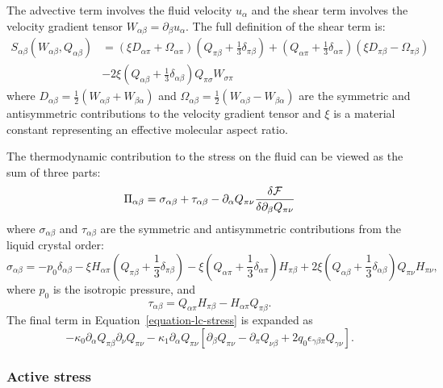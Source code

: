 The advective term involves the fluid velocity $u_\alpha$ and the shear
term involves the velocity gradient tensor
$W_{\alpha\beta}= \partial_\beta u_\alpha$. The full definition of the
shear term is:
\begin{eqnarray}
S_{\alpha\beta} (W_{\alpha\beta}, Q_{\alpha\beta})
& = 
(\xi D_{\alpha\pi} + \Omega_{\alpha\pi})
(Q_{\pi\beta} + {\textstyle \frac{1}{3}} \delta_{\pi\beta})
+
(Q_{\alpha\pi} + {\textstyle \frac{1}{3}} \delta_{\alpha\pi})
(\xi D_{\pi\beta} - \Omega_{\pi\beta})
\nonumber\\
&-
2\xi(Q_{\alpha\beta} + {\textstyle\frac{1}{3}}\delta_{\alpha\beta})
Q_{\pi\sigma}W_{\sigma\pi}
\nonumber
\end{eqnarray}
where $D_{\alpha\beta} = \frac{1}{2}(W_{\alpha\beta} + W_{\beta\alpha})$ and
 $\Omega_{\alpha\beta} = \frac{1}{2}(W_{\alpha\beta} - W_{\beta\alpha})$
are the symmetric and antisymmetric contributions to the velocity gradient
tensor and $\xi$ is a material constant representing an effective
molecular aspect ratio.


The thermodynamic contribution to the stress on the fluid can be viewed as
the sum of three parts:
\begin{equation}
\Pi_{\alpha\beta} = \sigma_{\alpha\beta} + \tau_{\alpha\beta}
-
\partial_\alpha Q_{\pi\nu}
\frac{\delta {\cal F}}{ \delta \partial_\beta Q_{\pi\nu}}
\label{equation-lc-stress}
\end{equation}
where $\sigma_{\alpha\beta}$ and $\tau_{\alpha\beta}$ are the symmetric
and antisymmetric contributions from the liquid crystal order:
\begin{equation}
\sigma_{\alpha\beta} =
-p_0 \delta_{\alpha\beta} 
- \xi H_{\alpha\pi}(Q_{\pi\beta} + {\textstyle\frac{1}{3}}\delta_{\pi\beta})
- \xi (Q_{\alpha\pi} + {\textstyle\frac{1}{3}}\delta_{\alpha\pi}) H_{\pi\beta}
+ 2\xi (Q_{\alpha\beta} + {\textstyle \frac{1}{3}}\delta_{\alpha\beta} )
Q_{\pi\nu} H_{\pi\nu},
\end{equation}
where $p_0$ is the isotropic pressure, and
\begin{equation}
\tau_{\alpha\beta} = Q_{\alpha\pi} H_{\pi\beta} - H_{\alpha\pi} Q_{\pi\beta}. 
\end{equation}
The final term in Equation~\ref{equation-lc-stress} is expanded as
$$
-\kappa_0 \partial_\alpha Q_{\pi\beta} \partial_\nu Q_{\pi\nu}
-\kappa_1 \partial_\alpha Q_{\pi\nu}
\left[ \partial_\beta Q_{\pi\nu} - \partial_\pi Q_{\nu\beta}
+ 2q_0 \epsilon_{\gamma\beta\pi} Q_{\gamma\nu} \right].
$$


\subsubsection{Active stress}

